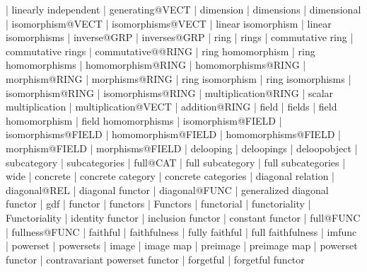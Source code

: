     |   linearly independent
    |   generating@VECT
    |   dimension
    |   dimensions
    |   dimensional
    |   isomorphism@VECT
    |   isomorphisms@VECT
    |   linear isomorphism
    |   linear isomorphisms
    |   inverse@GRP
    |   inverses@GRP
    |   ring
    |   rings
    |   commutative ring
    |   commutative rings
    |   commutative@@RING
    |   ring homomorphism
    |   ring homomorphisms
    |   homomorphism@RING
    |   homomorphisms@RING
    |   morphism@RING
    |   morphisms@RING
    |   ring isomorphism
    |   ring isomorphisms
    |   isomorphism@RING
    |   isomorphisms@RING
    |   multiplication@RING
    |   scalar multiplication
    |   multiplication@VECT
    |   addition@RING
    |   field
    |   fields
    |   field homomorphism
    |   field homomorphisms
    |   isomorphism@FIELD
    |   isomorphisms@FIELD
    |   homomorphism@FIELD
    |   homomorphisms@FIELD
    |   morphism@FIELD
    |   morphisms@FIELD
    |   delooping
    |   deloopings
    |   deloopobject
    |   subcategory
    |   subcategories
    |   full@CAT
    |   full subcategory
    |   full subcategories
    |   wide
    |   concrete
    |   concrete category
    |   concrete categories
    |   diagonal relation
    |   diagonal@REL
    |   diagonal functor
    |   diagonal@FUNC
    |   generalized diagonal functor
    |   gdf
    |   functor
    |   functors
    |   Functors
    |   functorial
    |   functoriality
    |   Functoriality
    |   identity functor
    |   inclusion functor
    |   constant functor
    |   full@FUNC
    |   fullness@FUNC
    |   faithful
    |   faithfulness
    |   fully faithful
    |   full faithfulness
    |   imfunc
    |   powerset
    |   powersets
    |   image
    |   image map
    |   preimage
    |   preimage map
    |   powerset functor
    |   contravariant powerset functor
    |   forgetful
    |   forgetful functor
